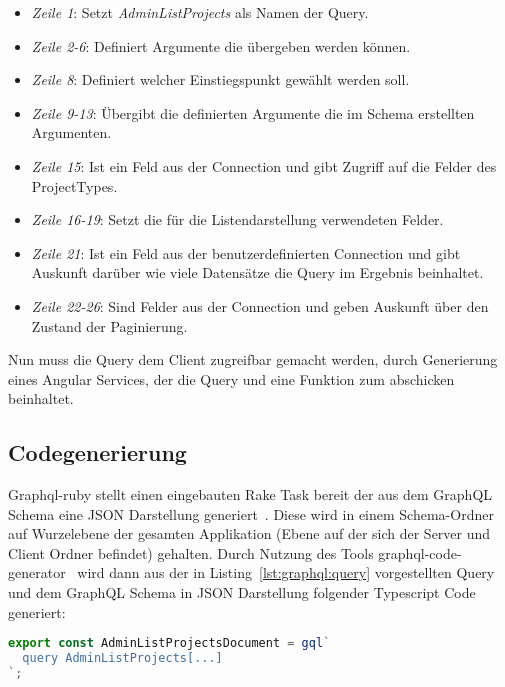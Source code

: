 \begin{itemize}
	\setlength\itemsep{-1em}
	\item \emph{Zeile 1}: Setzt \emph{AdminListProjects} als Namen der Query.
	\item \emph{Zeile 2-6}: Definiert Argumente die übergeben werden können.
	\item \emph{Zeile 8}: Definiert welcher Einstiegspunkt gewählt werden soll.
	\item \emph{Zeile 9-13}: Übergibt die definierten Argumente die im Schema erstellten Argumenten.
	\item \emph{Zeile 15}: Ist ein Feld aus der Connection und gibt Zugriff auf die Felder des ProjectTypes.
	\item \emph{Zeile 16-19}: Setzt die für die Listendarstellung verwendeten Felder.
	\item \emph{Zeile 21}: Ist ein Feld aus der benutzerdefinierten Connection und gibt Auskunft darüber wie viele Datensätze die Query im Ergebnis beinhaltet.

	\item \emph{Zeile 22-26}: Sind Felder aus der Connection und geben Auskunft über den Zustand der Paginierung.
\end{itemize}

Nun muss die Query dem Client zugreifbar gemacht werden, durch Generierung eines Angular Services, der die Query und eine Funktion zum abschicken beinhaltet.

\subsection{Codegenerierung}
Graphql-ruby stellt einen eingebauten Rake Task bereit der aus dem GraphQL Schema eine JSON Darstellung generiert~\cite{graphql-rake-task}. Diese wird in einem Schema-Ordner auf Wurzelebene der gesamten Applikation (Ebene auf der sich der Server und Client Ordner befindet) gehalten.
Durch Nutzung des Tools graphql-code-generator~\cite{graphql-code-generator} wird dann aus der in Listing~\ref{lst:graphql:query} vorgestellten Query und dem GraphQL Schema in JSON Darstellung folgender Typescript Code generiert:

\begin{lstlisting}[language=JavaScript,float=h!,caption={Generierter Aufruf der gql-Funktion erhält die AdminListProjects Query als String}, label={lst:graphql:gen-gql}]
export const AdminListProjectsDocument = gql`
  query AdminListProjects[...]
`;
\end{lstlisting}

